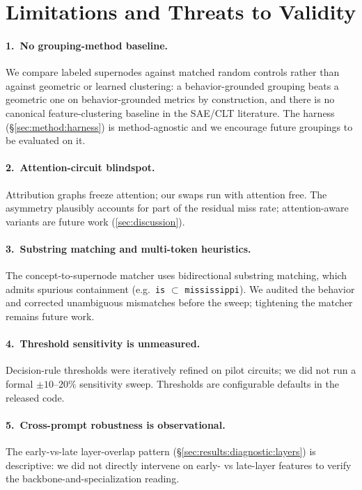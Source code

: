 \section{Limitations and Threats to Validity}
\label{sec:limitations}

\paragraph{1.\ No grouping-method baseline.}
We compare labeled supernodes against matched random controls rather than against geometric or learned clustering: a behavior-grounded grouping beats a geometric one on behavior-grounded metrics by construction, and there is no canonical feature-clustering baseline in the SAE/CLT literature. The harness (\S\ref{sec:method:harness}) is method-agnostic and we encourage future groupings to be evaluated on it.

\paragraph{2.\ Attention-circuit blindspot.}
Attribution graphs freeze attention; our swaps run with attention free. The asymmetry plausibly accounts for part of the residual miss rate; attention-aware variants are future work (\cref{sec:discussion}).

\paragraph{3.\ Substring matching and multi-token heuristics.}
The concept-to-supernode matcher uses bidirectional substring matching, which admits spurious containment (e.g.\ \texttt{is} $\subset$ \texttt{mississippi}). We audited the behavior and corrected unambiguous mismatches before the sweep; tightening the matcher remains future work.

\paragraph{4.\ Threshold sensitivity is unmeasured.}
Decision-rule thresholds were iteratively refined on pilot circuits; we did not run a formal $\pm 10$--$20\%$ sensitivity sweep. Thresholds are configurable defaults in the released code.

\paragraph{5.\ Cross-prompt robustness is observational.}
The early-vs-late layer-overlap pattern (\S\ref{sec:results:diagnostic:layers}) is descriptive: we did not directly intervene on early- vs late-layer features to verify the backbone-and-specialization reading.

